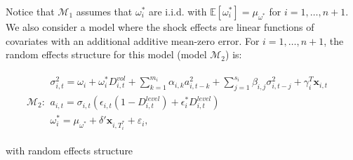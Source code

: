 \documentclass[11pt]{article}
\newcommand{\x}{\textbf{x}}
\def\mbf#1{\mathbf{#1}} %
\def\mc#1{\mathcal{#1}} %
\def\E{\mathbb{E}} %
\def\mc#1{\mathcal{#1}}
\theoremstyle{definition}
\begin{document}
Notice that $\mc{M}_1$ assumes that $\omega^{*}_i$ are i.i.d. with $\E[ \omega^{*}_i]=\mu_{\omega^{*}}$ for $i = 1, \ldots, n+1$. We also consider a model where the shock effects are linear functions of covariates with an additional additive mean-zero error. For $i = 1, \ldots, n+1$, the random effects structure for this model (model $\mc{M}_2$) is:

\begin{align*}
  \mc{M}_2 \colon \begin{array}{l}
     \sigma^{2}_{i,t} = \omega_{i} + \omega^{*}_i D^{vol}_{i,t} + \sum^{m_{i}}_{k=1}\alpha_{i,k}a^{2}_{i,t-k} + \sum_{j=1}^{s_{i}}\beta_{i,j}\sigma_{i,t-j}^{2} + \gamma_{i}^{T} \x_{i,t} \text{ }\\[.2cm]
     a_{i,t} = \sigma_{i,t}(\epsilon_{i,t}(1-D^{level}_{i,t}) + \epsilon^{*}_{i}D^{level}_{i,t})\\[.2cm]
     \omega_i^{*} = \mu_{\omega^{*}}+\delta'\mbf{x}_{i, T_i^*}+ \varepsilon_{i},
  \end{array}
  \end{align*}

  with random effects structure
\end{document}
